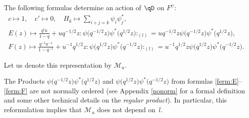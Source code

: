 \begin{Proposition} \label{prop: level 1 Fermion}
The following formulas determine an action of $\qD$ on $F^{\psi}$:
\begin{gather}
c \mapsto 1, \quad c' \mapsto 0, \quad H_k \mapsto \sum_{i+j=k} \psi_i \psi_j^*, \label{eq:centerFermi} \\
E(z) \mapsto \frac{q^{l} u }{1-q} + u q^{ - 1/2 }z : \! \psi\big( q^{-1/2} z\big) \psi^* \big( q^{1/2} z\big) \! :_{(l)} = u q^{-1/2} z \psi\big( q^{-1/2} z\big) \psi^* \big( q^{1/2} z\big), \label{ferm:E} \\
F(z) \mapsto \frac{q^{-l} u^{-1} }{1-q^{-1}} + u^{-1} q^{1/2} z : \! \psi\big( q^{1/2} z\big) \psi^* \big(q^{-1/2} z\big)\!:_{(l)}= u^{-1} q^{1/2} z \psi\big( q^{1/2} z\big) \psi^* \big(q^{-1/2} z\big). \!\!\!\label{ferm:F}
\end{gather}
\end{Proposition}

Let us denote this representation by $\mathcal{M}_u$.

\begin{Remark}The Products $\psi\big( q^{-1/2} z\big) \psi^* \big( q^{1/2} z\big)$ and $\psi\big( q^{1/2} z\big) \psi^* \big(q^{-1/2} z\big)$ from formulas \eqref{ferm:E}--\eqref{ferm:F} are not normally ordered (see Appendix \ref{nonorm} for a formal definition and some other technical details on the \emph{regular product}). In particular, this reformulation implies that $\mathcal{M}_u$ does not depend on~$l$.
\end{Remark}
